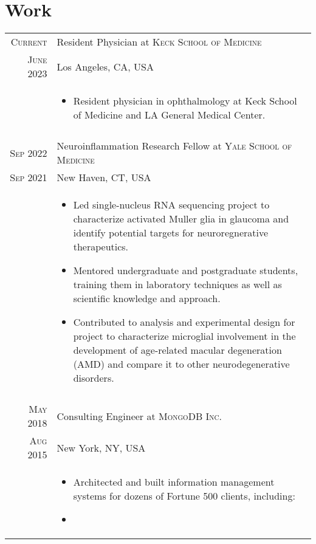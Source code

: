 \documentclass[a4paper,10pt]{article}
\begin{document}
\section{Work}
\begin{longtable}{r|p{11cm}}
 \nopagebreak \textsc{Current} & Resident Physician at \textsc{Keck School of Medicine}\\
 \nopagebreak \textsc{June 2023} & \small{Los Angeles, CA, USA} \\
 \nopagebreak & \footnotesize{
	\begin{itemize}
		\item[]{
			Resident physician in ophthalmology at Keck School of Medicine and LA General Medical Center.
		}
	\end{itemize}
   }\\
 \multicolumn{2}{c}{} \\
 \nopagebreak \textsc{Sep 2022} & Neuroinflammation Research Fellow at \textsc{Yale School of Medicine}\\
 \nopagebreak \textsc{Sep 2021} & \small{New Haven, CT, USA} \\
 \nopagebreak & \footnotesize{
	\begin{itemize}
		\item[]{
			Led single-nucleus RNA sequencing project to characterize activated Muller glia in glaucoma and identify potential targets for neuroregnerative therapeutics.
		}
		\item[]{
			Mentored undergraduate and postgraduate students, training them in laboratory techniques as well as scientific knowledge and approach.
		}
		\item[]{
			Contributed to analysis and experimental design for project to characterize microglial involvement in the development of age-related macular degeneration (AMD) and compare it to other neurodegenerative disorders.
		}
	\end{itemize}
   }\\
 \multicolumn{2}{c}{} \\
 \nopagebreak \textsc{May 2018} & Consulting Engineer at \textsc{MongoDB Inc.}\\
 \nopagebreak \textsc{Aug 2015} & \small{New York, NY, USA} \\
 \nopagebreak & \footnotesize{
	\begin{itemize}
		\item[]{
			Architected and built information management systems for dozens of Fortune 500
			clients, including:
		}
		\item[]{
}
\end{itemize}}
\end{longtable}
\end{document}
